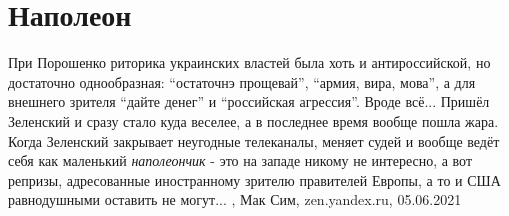  
 
 
 
 
\chapter{Наполеон}
\label{sec:slova.napoleon}

При Порошенко риторика украинских властей была хоть и антироссийской, но
достаточно однообразная: \enquote{остаточнэ прощевай}, \enquote{армия, вира, мова}, а для
внешнего зрителя \enquote{дайте денег} и \enquote{российская агрессия}. Вроде всё...  Пришёл
Зеленский и сразу стало куда веселее, а в последнее время вообще пошла жара.
Когда Зеленский закрывает неугодные телеканалы, меняет судей и вообще ведёт
себя как маленький \emph{наполеончик} - это на западе никому не интересно, а вот
репризы, адресованные иностранному зрителю правителей Европы, а то и США
равнодушными оставить не могут...
, 
Мак Сим, zen.yandex.ru, 05.06.2021

